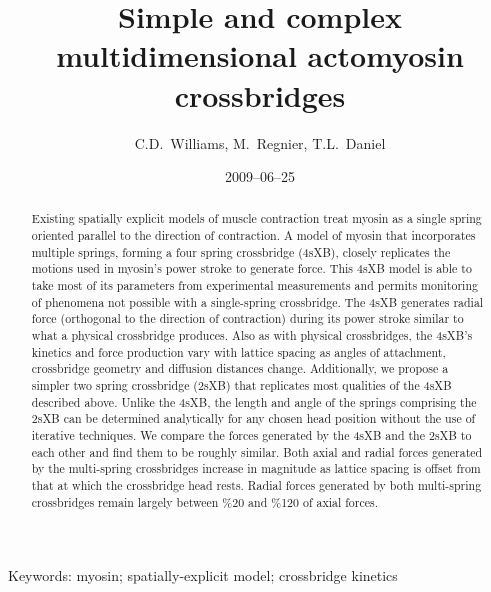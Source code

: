 \documentclass[]{article}
\title{Simple and complex multidimensional actomyosin crossbridges}
\author{C.D.\ Williams, M.\ Regnier, T.L.\ Daniel}
\date{2009--06--25}
\begin{document}
\maketitle{}

\begin{abstract} 
Existing spatially explicit models of muscle contraction treat myosin as a single spring oriented parallel to the direction of contraction.
A model of myosin that incorporates multiple springs, forming a four spring crossbridge (4sXB), closely replicates the motions used in myosin's power stroke to generate force.
This 4sXB model is able to take most of its parameters from experimental measurements and permits monitoring of phenomena not possible with a single-spring crossbridge.
The 4sXB generates radial force (orthogonal to the direction of contraction) during its power stroke similar to what a physical crossbridge produces.
Also as with physical crossbridges, the 4sXB's kinetics and force production vary with lattice spacing as angles of attachment, crossbridge geometry and diffusion distances change.
Additionally, we propose a simpler two spring crossbridge (2sXB) that replicates most qualities of the 4sXB described above.
Unlike the 4sXB, the length and angle of the springs comprising the 2sXB can be determined analytically for any chosen head position without the use of iterative techniques.
We compare the forces generated by the 4sXB and the 2sXB to each other and find them to be roughly similar.
Both axial and radial forces generated by the multi-spring crossbridges increase in magnitude as lattice spacing is offset from that at which the crossbridge head rests.
Radial forces generated by both multi-spring crossbridges remain largely between \%20 and \%120 of axial forces.
\end{abstract}

Keywords: myosin; spatially-explicit model; crossbridge kinetics

\end{document}
